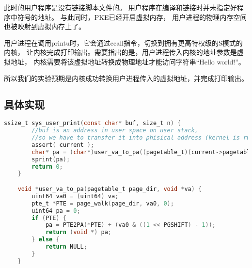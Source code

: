 此时的用户程序是没有链接脚本文件的。
用户程序在编译和链接时并未指定好程序中符号的地址。
与此同时，PKE已经开启虚拟内存，
用户进程的物理内存空间也被映射到虚拟内存上了。

用户进程在调用printu时，它会通过ecall指令，切换到拥有更高特权级的S模式的内核，
让内核完成打印输出。需要指出的是，用户进程传入内核的地址参数是虚拟地址，
内核需要将该虚拟地址转换成物理地址才能访问字符串“Hello world!”。

所以我们的实验预期是内核成功转换用户进程传入的虚拟地址，并完成打印输出。


\subsection{具体实现}

\begin{lstlisting}[caption={虚拟地址到物理地址的转换}, label={lst:app_virt_to_phys}, language=C]
    ssize_t sys_user_print(const char* buf, size_t n) {
        //buf is an address in user space on user stack,
        //so we have to transfer it into phisical address (kernel is running in direct mapping).
        assert( current );
        char* pa = (char*)user_va_to_pa((pagetable_t)(current->pagetable), (void*)buf);
        sprint(pa);
        return 0;
    }    

    void *user_va_to_pa(pagetable_t page_dir, void *va) {
        uint64 va0 = (uint64) va;
        pte_t *PTE = page_walk(page_dir, va0, 0);
        uint64 pa = 0;
        if (PTE) {
            pa = PTE2PA(*PTE) + (va0 & ((1 << PGSHIFT) - 1));
            return (void *) pa;
        } else {
            return NULL;
        }
    }    
\end{lstlisting}


